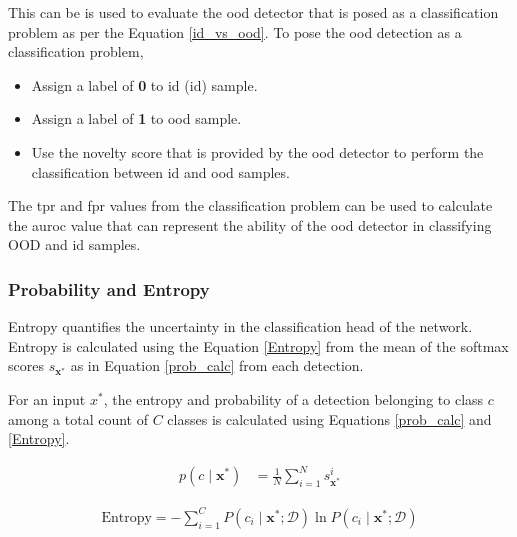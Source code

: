     This can be is used to evaluate the \acrshort{ood} detector that is posed as a classification problem as per the Equation \ref{id_vs_ood}. To pose the \acrshort{ood} detection as a classification problem,
    \begin{itemize}
        \item Assign a label of \textbf{0} to \acrlong{id} (\acrshort{id}) sample. 
        \item Assign a label of \textbf{1} to \acrshort{ood} sample.
        \item Use the novelty score that is provided by the \acrshort{ood} detector to perform the classification between \acrshort{id} and \acrshort{ood} samples.
    \end{itemize}
    
    The \acrshort{tpr} and \acrshort{fpr} values from the classification problem can be used to calculate the \acrshort{auroc} value that can represent the ability of the \acrshort{ood} detector in classifying \acrshort{OOD} and \acrshort{id} samples.
    
    \subsubsection{Probability and Entropy}
    \label{prob_entropy_calc}
    Entropy quantifies the uncertainty in the classification head of the network. Entropy is calculated using the Equation \ref{Entropy} from the mean of the softmax scores $s_{\mathbf{x}^{*}}$ as in Equation \ref{prob_calc} from each detection. 
    
    For an input $x^*$, the entropy and probability of a detection belonging to class $c$ among a total count of $C$ classes  is calculated using Equations \ref{prob_calc} and \ref{Entropy}. 
    
    \begin{equation}
            \label{prob_calc}
            \begin{aligned}
                p\left(c \mid \mathbf{x}^{*}\right) &= \frac{1}{N} \sum_{i=1}^{N} s_{\mathbf{x}^{*}}^{i}
            \end{aligned}
        \end{equation}
    
    \begin{equation}
        \label{Entropy}
        \begin{array}{l}
            \text{Entropy} =-\sum_{i=1}^{C} P\left(c_i \mid \mathbf{x}^{*} ; \mathcal{D}\right) \ln P\left(c_i \mid \mathbf{x}^{*} ; \mathcal{D}\right) 
        \end{array}
    \end{equation}
    

